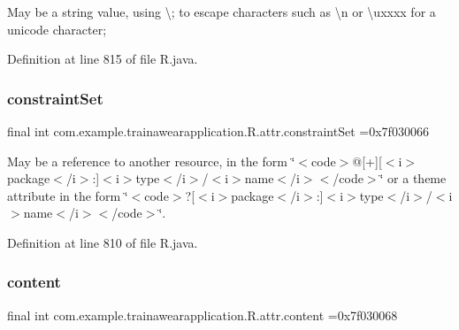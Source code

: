 May be a string value, using \textquotesingle{}\textbackslash{};\textquotesingle{} to escape characters such as \textquotesingle{}\textbackslash{}n\textquotesingle{} or \textquotesingle{}\textbackslash{}uxxxx\textquotesingle{} for a unicode character; 

Definition at line 815 of file R.\+java.

\mbox{\label{classcom_1_1example_1_1trainawearapplication_1_1_r_1_1attr_a67710bbbc6a220c9a4f231a16c5f9bff}} 
\subsubsection{\texorpdfstring{constraintSet}{constraintSet}}
{\footnotesize\ttfamily final int com.\+example.\+trainawearapplication.\+R.\+attr.\+constraint\+Set =0x7f030066\hspace{0.3cm}{\ttfamily [static]}}

May be a reference to another resource, in the form \char`\"{}$<$code$>$@\mbox{[}+\mbox{]}\mbox{[}$<$i$>$package$<$/i$>$\+:\mbox{]}$<$i$>$type$<$/i$>$/$<$i$>$name$<$/i$>$$<$/code$>$\char`\"{} or a theme attribute in the form \char`\"{}$<$code$>$?\mbox{[}$<$i$>$package$<$/i$>$\+:\mbox{]}$<$i$>$type$<$/i$>$/$<$i$>$name$<$/i$>$$<$/code$>$\char`\"{}. 

Definition at line 810 of file R.\+java.

\mbox{\label{classcom_1_1example_1_1trainawearapplication_1_1_r_1_1attr_adcfb37c3b909c528ea065338c60dc8d7}} 
\subsubsection{\texorpdfstring{content}{content}}
{\footnotesize\ttfamily final int com.\+example.\+trainawearapplication.\+R.\+attr.\+content =0x7f030068\hspace{0.3cm}{\ttfamily [static]}}

